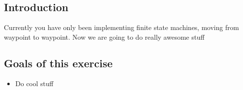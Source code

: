 \documentclass{article}
\begin{document}

\subsection*{Introduction}
Currently you have only been implementing finite state machines, moving from waypoint to waypoint. Now we are going to do really awesome stuff
\subsection*{Goals of this exercise}
\begin{itemize}
\item Do cool stuff
\end{itemize}
\end{document}
